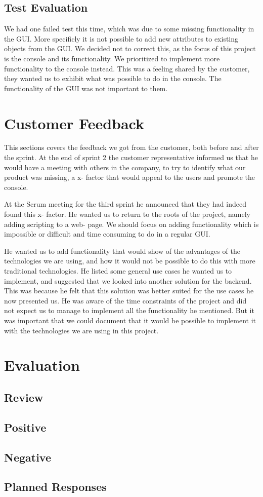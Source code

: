\subsection{Test Evaluation}
We had one failed test this time, which was due to some missing functionality in the GUI. More specificly it is not possible to add new attributes to existing objects from the GUI. We decided not to correct this, as the focus of this project is the console and its functionality. We prioritized to implement more functionality to the console instead. This was a feeling shared by the customer, they wanted us to exhibit what was possible to do in the console. The functionality of the GUI was not important to them.

\section{Customer Feedback}
This sections covers the feedback we got from the customer, both before and after the sprint.
\newline
\newline
At the end of sprint 2 the customer representative informed us that he would have a meeting with others in the company, to try to identify what our product was missing, a x- factor that would appeal to the users and promote the console.

At the Scrum meeting for the third sprint he announced that they had indeed found this x- factor. He wanted us to return to the roots of the project, namely adding scripting to a web- page. We should focus on adding functionality which is impossible or difficult and time consuming to do in a regular GUI.

He wanted us to add functionality that would show of the advantages of the technologies we are using, and how it would not be possible to do this with more traditional technologies. He listed some general use cases he wanted us to implement, and suggested that we looked into another solution for the backend. This was because he felt that this solution was better suited for the use cases he now presented us. He was aware of the time constraints of the project and did not expect us to manage to implement all the functionality he mentioned. But it was important that we could document that it would be possible to implement it with the technologies we are using in this project.


\section{Evaluation}
\subsection{Review}
\subsection{Positive}
\subsection{Negative}
\subsection{Planned Responses}
